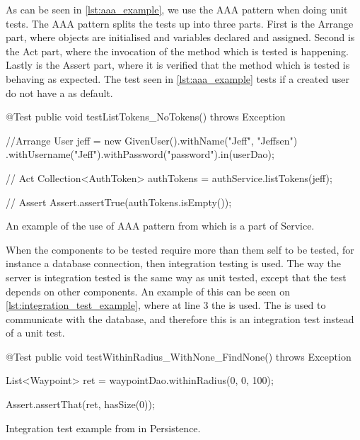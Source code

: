As can be seen in \cref{lst:aaa_example}, we use the \ac{AAA} pattern when doing unit tests.
The \ac{AAA} pattern splits the tests up into three parts.
First is the Arrange part, where objects are initialised and variables declared and assigned.
Second is the Act part, where the invocation of the method which is tested is happening.
Lastly is the Assert part, where it is verified that the method which is tested is behaving as expected.\cite{aaa_pattern}
The test seen in \cref{lst:aaa_example} tests if a created user do not have a  as default.

\begin{listing}
    \begin{java2}
        @Test
        public void testListTokens_NoTokens() throws Exception {
            //Arrange
            User jeff = new GivenUser().withName("Jeff", "Jeffsen")
                .withUsername("Jeff").withPassword("password").in(userDao);

            // Act
            Collection<AuthToken> authTokens = authService.listTokens(jeff);

            // Assert
            Assert.assertTrue(authTokens.isEmpty());
        }
    \end{java2}
    \caption{An example of the use of \ac{AAA} pattern from  which is a part of Service.}
    \label{lst:aaa_example}
\end{listing}

\bigskip

When the components to be tested require more than them self to be tested, 
for instance a database connection,
then integration testing is used.
The way the server is integration tested is the same way as unit tested,
except that the test depends on other components.
An example of this can be seen on \cref{lst:integration_test_example},
where at line 3 the  is used.
The  is used to communicate with the database,
and therefore this is an integration test instead of a unit test.

\begin{listing}
    \begin{java2}
        @Test
        public void testWithinRadius_WithNone_FindNone() throws Exception {
            List<Waypoint> ret = waypointDao.withinRadius(0, 0, 100);

            Assert.assertThat(ret, hasSize(0));
        }
    \end{java2}
    \caption{Integration test example from  in Persistence.}
    \label{lst:integration_test_example}
\end{listing}

